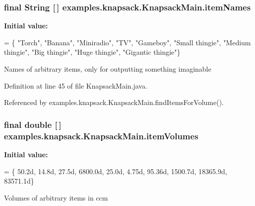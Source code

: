 \hypertarget{classexamples_1_1knapsack_1_1_knapsack_main_ae9c0550852c5c346f14d9c22ab1f00c4}{
\subsubsection[{item\-Names}]{\setlength{\rightskip}{0pt plus 5cm}final String \mbox{[}$\,$\mbox{]} examples.\-knapsack.\-Knapsack\-Main.\-item\-Names\hspace{0.3cm}{\ttfamily [static]}}}\label{classexamples_1_1knapsack_1_1_knapsack_main_ae9c0550852c5c346f14d9c22ab1f00c4}
{\bfseries Initial value\-:}
\begin{DoxyCode}
= \{
      \textcolor{stringliteral}{"Torch"}, \textcolor{stringliteral}{"Banana"}, \textcolor{stringliteral}{"Miniradio"}, \textcolor{stringliteral}{"TV"}, \textcolor{stringliteral}{"Gameboy"}, \textcolor{stringliteral}{"Small thingie"},
      \textcolor{stringliteral}{"Medium thingie"}, \textcolor{stringliteral}{"Big thingie"}, \textcolor{stringliteral}{"Huge thingie"}, \textcolor{stringliteral}{"Gigantic thingie"}\}
\end{DoxyCode}
Names of arbitrary items, only for outputting something imaginable 

Definition at line 45 of file Knapsack\-Main.\-java.



Referenced by examples.\-knapsack.\-Knapsack\-Main.\-find\-Items\-For\-Volume().

\hypertarget{classexamples_1_1knapsack_1_1_knapsack_main_a06ab99a0d126994951ab7338311b1893}{
\subsubsection[{item\-Volumes}]{\setlength{\rightskip}{0pt plus 5cm}final double \mbox{[}$\,$\mbox{]} examples.\-knapsack.\-Knapsack\-Main.\-item\-Volumes\hspace{0.3cm}{\ttfamily [static]}}}\label{classexamples_1_1knapsack_1_1_knapsack_main_a06ab99a0d126994951ab7338311b1893}
{\bfseries Initial value\-:}
\begin{DoxyCode}
= \{
      50.2d, 14.8d, 27.5d, 6800.0d, 25.0d, 4.75d, 95.36d, 1500.7d, 18365.9d,
      83571.1d\}
\end{DoxyCode}
Volumes of arbitrary items in ccm 

